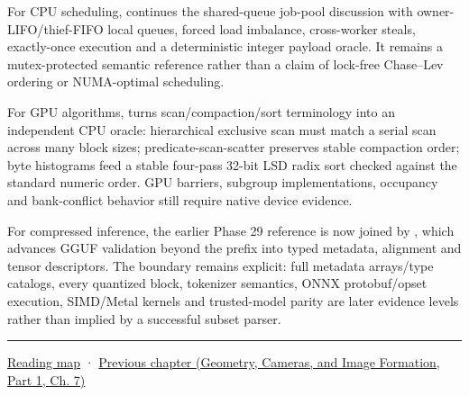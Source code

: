 For CPU scheduling,  continues the shared-queue job-pool discussion with owner-LIFO/thief-FIFO local queues, forced load imbalance, cross-worker steals, exactly-once execution and a deterministic integer payload oracle. It remains a mutex-protected semantic reference rather than a claim of lock-free Chase--Lev ordering or NUMA-optimal scheduling.

For GPU algorithms,  turns scan/compaction/sort terminology into an independent CPU oracle: hierarchical exclusive scan must match a serial scan across many block sizes; predicate-scan-scatter preserves stable compaction order; byte histograms feed a stable four-pass 32-bit LSD radix sort checked against the standard numeric order. GPU barriers, subgroup implementations, occupancy and bank-conflict behavior still require native device evidence.

For compressed inference, the earlier Phase 29 reference is now joined by , which advances GGUF validation beyond the prefix into typed metadata, alignment and tensor descriptors. The boundary remains explicit: full metadata arrays/type catalogs, every quantized block, tokenizer semantics, ONNX protobuf/opset execution, SIMD/Metal kernels and trusted-model parity are later evidence levels rather than implied by a successful subset parser.

\begin{center}\rule{0.5\linewidth}{0.5pt}\end{center}

\hyperref[volume-reading-map]{Reading map} · \href{../03-Geometry-Cameras-and-Image-Formation-P01/main.pdf\#nameddest=02-foundations-ii-ch038-reconstruct-the-complete-geometry-pipeline}{Previous chapter (Geometry, Cameras, and Image Formation, Part 1, Ch. 7)}
